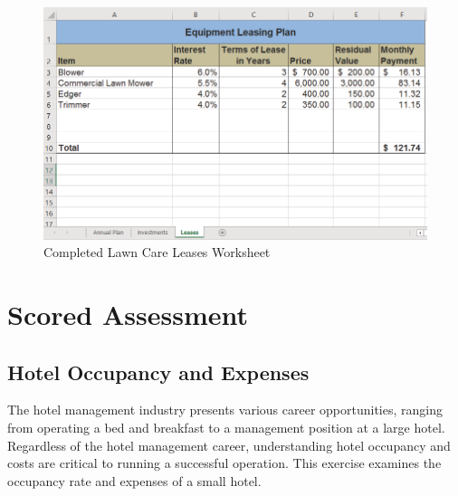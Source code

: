 \begin{figure}[H]
	\centering
	\includegraphics[width=\maxwidth{.95\linewidth}]{gfx/ch02_fig49}
	\caption{Completed Lawn Care Leases Worksheet}
	\label{02:fig49}
\end{figure}

\section{Scored Assessment}

\subsection{Hotel Occupancy and Expenses}

The hotel management industry presents various career opportunities, ranging from operating a bed and breakfast to a management position at a large hotel. Regardless of the hotel management career, understanding hotel occupancy and costs are critical to running a successful operation. This exercise examines the occupancy rate and expenses of a small hotel.

